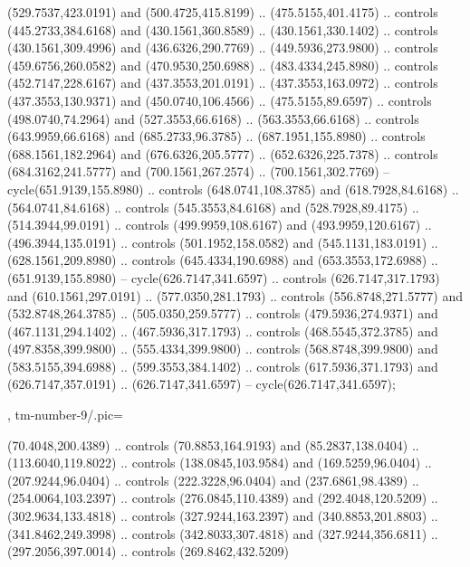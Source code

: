 {{\begin{scope}[y=-0.80pt,x=0.80pt,scale=0.04,yshift=197pt,xshift=-450pt]
      (529.7537,423.0191) and (500.4725,415.8199) .. (475.5155,401.4175) .. controls
      (445.2733,384.6168) and (430.1561,360.8589) .. (430.1561,330.1402) .. controls
      (430.1561,309.4996) and (436.6326,290.7769) .. (449.5936,273.9800) .. controls
      (459.6756,260.0582) and (470.9530,250.6988) .. (483.4334,245.8980) .. controls
      (452.7147,228.6167) and (437.3553,201.0191) .. (437.3553,163.0972) .. controls
      (437.3553,130.9371) and (450.0740,106.4566) .. (475.5155,89.6597) .. controls
      (498.0740,74.2964) and (527.3553,66.6168) .. (563.3553,66.6168) .. controls
      (643.9959,66.6168) and (685.2733,96.3785) .. (687.1951,155.8980) .. controls
      (688.1561,182.2964) and (676.6326,205.5777) .. (652.6326,225.7378) .. controls
      (684.3162,241.5777) and (700.1561,267.2574) .. (700.1561,302.7769) --
      cycle(651.9139,155.8980) .. controls (648.0741,108.3785) and
      (618.7928,84.6168) .. (564.0741,84.6168) .. controls (545.3553,84.6168) and
      (528.7928,89.4175) .. (514.3944,99.0191) .. controls (499.9959,108.6167) and
      (493.9959,120.6167) .. (496.3944,135.0191) .. controls (501.1952,158.0582) and
      (545.1131,183.0191) .. (628.1561,209.8980) .. controls (645.4334,190.6988) and
      (653.3553,172.6988) .. (651.9139,155.8980) -- cycle(626.7147,341.6597) ..
      controls (626.7147,317.1793) and (610.1561,297.0191) .. (577.0350,281.1793) ..
      controls (556.8748,271.5777) and (532.8748,264.3785) .. (505.0350,259.5777) ..
      controls (479.5936,274.9371) and (467.1131,294.1402) .. (467.5936,317.1793) ..
      controls (468.5545,372.3785) and (497.8358,399.9800) .. (555.4334,399.9800) ..
      controls (568.8748,399.9800) and (583.5155,394.6988) .. (599.3553,384.1402) ..
      controls (617.5936,371.1793) and (626.7147,357.0191) .. (626.7147,341.6597) --
      cycle(626.7147,341.6597);
    \end{scope}
  },
  tm-number-9/.pic={
    \begin{scope}[y=-0.80pt,x=0.80pt,scale=0.04,yshift=220pt,xshift=-160pt]
       (70.4048,200.4389) .. controls (70.8853,164.9193)
        and (85.2837,138.0404) .. (113.6040,119.8022) .. controls (138.0845,103.9584)
        and (169.5259,96.0404) .. (207.9244,96.0404) .. controls (222.3228,96.0404)
        and (237.6861,98.4389) .. (254.0064,103.2397) .. controls (276.0845,110.4389)
        and (292.4048,120.5209) .. (302.9634,133.4818) .. controls (327.9244,163.2397)
        and (340.8853,201.8803) .. (341.8462,249.3998) .. controls (342.8033,307.4818)
        and (327.9244,356.6811) .. (297.2056,397.0014) .. controls (269.8462,432.5209)

\end{scope}}}
